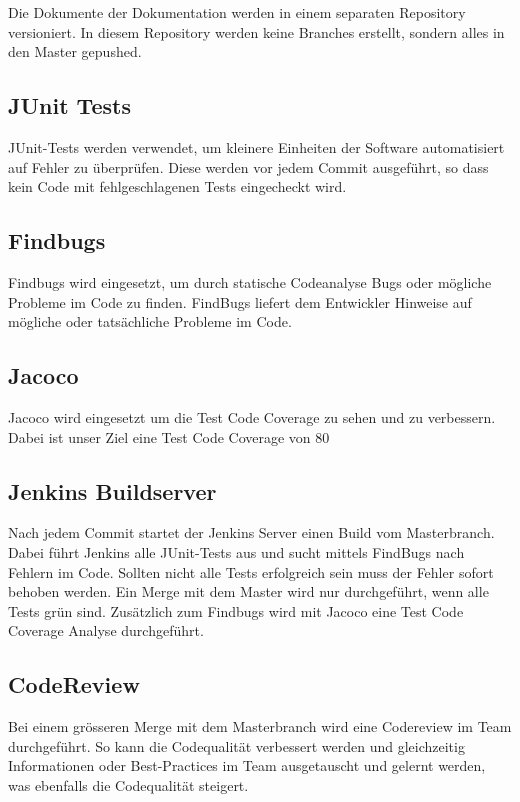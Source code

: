 \documentclass[11pt]{scrartcl}
\begin{document}
Die Dokumente der Dokumentation werden in einem separaten 
Repository versioniert. In diesem Repository werden keine Branches 
erstellt, sondern alles in den Master gepushed.
\subsection{JUnit Tests}
JUnit-Tests werden verwendet, um kleinere Einheiten der Software 
automatisiert auf Fehler zu überprüfen. Diese werden vor jedem Commit ausgeführt, 
so dass kein Code mit fehlgeschlagenen Tests eingecheckt wird.
\subsection{Findbugs}
Findbugs wird eingesetzt, um durch statische Codeanalyse Bugs 
oder mögliche Probleme im Code zu finden. FindBugs liefert dem Entwickler 
Hinweise auf mögliche oder tatsächliche Probleme im Code.
\subsection{Jacoco}
Jacoco wird eingesetzt um die Test Code Coverage zu sehen und zu verbessern.
Dabei ist unser Ziel eine Test Code Coverage von 80 %
\subsection{Jenkins Buildserver}
Nach jedem Commit startet der Jenkins Server einen Build vom Masterbranch. 
Dabei führt Jenkins alle JUnit-Tests aus und sucht mittels FindBugs nach
 Fehlern im Code. Sollten nicht alle Tests erfolgreich sein muss der 
 Fehler sofort behoben werden. Ein Merge mit dem Master wird nur durchgeführt, 
 wenn alle Tests grün sind.
 Zusätzlich zum Findbugs wird mit Jacoco eine Test Code Coverage Analyse 
 durchgeführt.
\subsection{CodeReview}
Bei einem grösseren Merge mit dem Masterbranch wird eine Codereview 
im Team durchgeführt. So kann die Codequalität verbessert werden und 
gleichzeitig Informationen oder Best-Practices im Team ausgetauscht und 
gelernt werden, was ebenfalls die Codequalität steigert.
\end{document}
